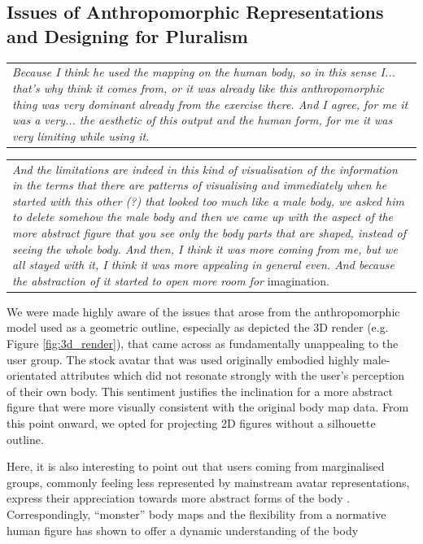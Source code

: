 \subsection*{Issues of Anthropomorphic Representations and Designing for Pluralism}

\begin{center}
\begin{tabular}{ p{13cm}}
\textit{Because I think he used the mapping on the human body, so in this sense I... that's why  think it comes from, or it was already like this anthropomorphic thing was very dominant already from the exercise there. And I agree, for me it was a very... the aesthetic of this output and the human form, for me it was very limiting while using it.}
\end{tabular}
\end{center}

\begin{center}
\begin{tabular}{ p{13cm}}
\textit{And the limitations are indeed in this kind of visualisation of the information in the terms that there are patterns of visualising and immediately when he started with this other (?) that looked too much like a male body, we asked him to delete somehow the male body and then we came up with the aspect of the more abstract figure that you see only the body parts that are shaped, instead of seeing the whole body. And then, I think it was more coming from me, but we all stayed with it, I think it was more appealing in general even. And because the abstraction of it started to open more room for} imagination.
\end{tabular}
\end{center}

We were made highly aware of the issues that arose from the anthropomorphic model used as a geometric outline, especially as depicted the 3D render (e.g. Figure \ref{fig:3d_render}), that came across as fundamentally unappealing to the user group. The stock avatar that was used originally embodied highly male-orientated attributes which did not resonate strongly with the user's perception of their own body. This sentiment justifies the inclination for a more abstract figure that were more visually consistent with the original body map data. From this point onward, we opted for projecting 2D figures without a silhouette outline.

Here, it is also interesting to point out that users coming from marginalised groups, commonly feeling less represented by mainstream avatar representations, express their appreciation towards more abstract forms of the body \cite{niehaus_making_2021}. Correspondingly, ``monster'' body maps and the flexibility from a normative human figure has shown to offer a dynamic understanding of the body \cite{hook_soma_2019}

